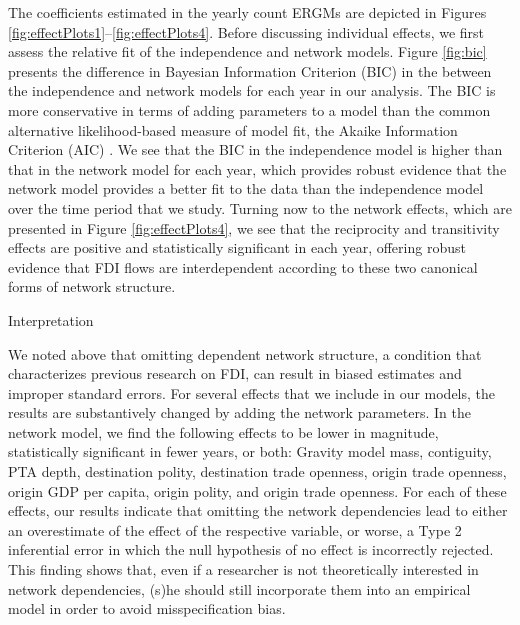 \documentclass[12pt]{article}
\begin{document}
The coefficients estimated in the yearly count ERGMs are depicted in Figures \ref{fig:effectPlots1}--\ref{fig:effectPlots4}. Before discussing individual effects, we first assess the relative fit of the independence and network models. Figure \ref{fig:bic} presents the difference in Bayesian Information Criterion (BIC) in the between the independence and network models for each year in our analysis. The BIC is more conservative in terms of adding parameters to a model than the common alternative likelihood-based measure of model fit, the Akaike Information Criterion (AIC) \citep{waldorp2005model,abrahamowicz1990optimal,raftery1999bayes}. We see that the BIC in the independence model is higher than that in the network model for each year, which provides robust evidence that the network model provides a better fit to the data than the independence model over the time period that we study. Turning now to the network effects, which are presented in Figure \ref{fig:effectPlots4}, we see that the reciprocity and transitivity effects are positive and statistically significant in each year, offering robust evidence that FDI flows are interdependent according to these two canonical forms of network structure.

Interpretation

We noted above that omitting dependent network structure, a condition that characterizes previous research on FDI, can result in biased estimates and improper standard errors. For several effects that we include in our models, the results are substantively changed by adding the network parameters. In the network model, we find the following effects to be lower in magnitude, statistically significant in fewer years, or both: Gravity model mass, contiguity, PTA depth, destination polity, destination trade openness, origin trade openness, origin GDP per capita, origin polity, and origin trade openness. For each of these effects, our results indicate that omitting the network dependencies lead to either an overestimate of the effect of the respective variable, or worse, a Type 2 inferential error in which the null hypothesis of no effect is incorrectly rejected. This finding shows that, even if a researcher is not theoretically interested in network dependencies, (s)he should still incorporate them into an empirical model in order to avoid misspecification bias.
\end{document}
